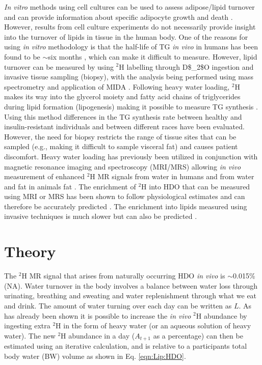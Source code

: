 \textit{In vitro} methods using cell cultures can be used to assess adipose/lipid turnover and can provide information about specific adipocyte growth and death \cite{Tchkonia2002FatPreadipocytes}. However, results from cell culture experiments do not necessarily provide insight into the turnover of lipids in tissue in the human body. One of the reasons for using \textit{in vitro} methodology is that the half-life of \ac{TG} \textit{in vivo} in humans has been found to be $\sim$six months \cite{Strawford2004AdiposeO}, which can make it difficult to measure. However, lipid turnover can be measured by using $^2$H labelling through \ac{D$_2$O} ingestion and invasive tissue sampling (biopsy), with the analysis being performed using mass spectrometry and application of \ac{MIDA} \cite{White2019DynamicsDisease, Strawford2004AdiposeO, Belew2022DeTracers, Turner2003MeasurementMIDA}. Following heavy water loading, $^2$H makes its way into the glycerol moiety and fatty acid chains of triglycerides during lipid formation (lipogenesis) making it possible to measure TG synthesis \cite{Turner2003MeasurementMIDA}. Using this method differences in the \ac{TG} synthesis rate between healthy and insulin-resistant individuals \cite{Allister2015InHumans} and between different races \cite{White2018RacialHumans} have been evaluated. However, the need for biopsy restricts the range of tissue sites that can be sampled (e.g., making it difficult to sample visceral fat) and causes patient discomfort. Heavy water loading has previously been utilized in conjunction with magnetic resonance imaging and spectroscopy (\ac{MRI}/\ac{MRS}) allowing \textit{in vivo} measurement of enhanced $^2$H MR signals from water in humans and from water and fat in animals fat \cite{Brereton1989TheMice, Cocking2023DeuteriumDosing}. The enrichment of $^2$H into \ac{HDO} that can be measured using \ac{MRI} or \ac{MRS} has been shown to follow physiological estimates and can therefore be accurately predicted \cite{Cocking2023DeuteriumDosing}. The enrichment into lipids measured using invasive techniques is much slower \cite{White2019DynamicsDisease, Strawford2004AdiposeO} but can also be predicted \cite{White2019DynamicsDisease}.

\section{Theory}
\label{Chap:Lip:Theory}

The $^2$H MR signal that arises from naturally occurring \ac{HDO} \textit{in vivo} is $\sim$0.015\% (NA). Water turnover in the body involves a balance between water loss through urinating, breathing and sweating and water replenishment through what we eat and drink. The amount of water turning over each day can be written as $L$. As has already been shown it is possible to increase the \textit{in vivo} $^2$H abundance by ingesting extra $^2$H in the form of heavy water (or an aqueous solution of heavy water). The new $^2$H abundance in a day ($A_{t+1}$ as a percentage) can then be estimated using an iterative calculation, and is relative to a participants total body water (BW) volume as shown in Eq. \ref{eqn:Lip:HDO}.

